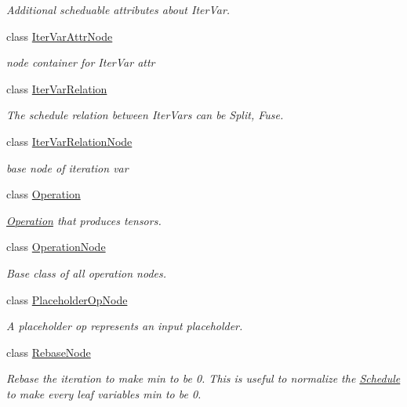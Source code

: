 \begin{DoxyCompactItemize}
\begin{DoxyCompactList}\small\item\em Additional scheduable attributes about Iter\+Var. \end{DoxyCompactList}\item 
class \hyperlink{classtvm_1_1te_1_1IterVarAttrNode}{Iter\+Var\+Attr\+Node}
\begin{DoxyCompactList}\small\item\em node container for Iter\+Var attr \end{DoxyCompactList}\item 
class \hyperlink{classtvm_1_1te_1_1IterVarRelation}{Iter\+Var\+Relation}
\begin{DoxyCompactList}\small\item\em The schedule relation between Iter\+Vars can be Split, Fuse. \end{DoxyCompactList}\item 
class \hyperlink{classtvm_1_1te_1_1IterVarRelationNode}{Iter\+Var\+Relation\+Node}
\begin{DoxyCompactList}\small\item\em base node of iteration var \end{DoxyCompactList}\item 
class \hyperlink{classtvm_1_1te_1_1Operation}{Operation}
\begin{DoxyCompactList}\small\item\em \hyperlink{classtvm_1_1te_1_1Operation}{Operation} that produces tensors. \end{DoxyCompactList}\item 
class \hyperlink{classtvm_1_1te_1_1OperationNode}{Operation\+Node}
\begin{DoxyCompactList}\small\item\em Base class of all operation nodes. \end{DoxyCompactList}\item 
class \hyperlink{classtvm_1_1te_1_1PlaceholderOpNode}{Placeholder\+Op\+Node}
\begin{DoxyCompactList}\small\item\em A placeholder op represents an input placeholder. \end{DoxyCompactList}\item 
class \hyperlink{classtvm_1_1te_1_1RebaseNode}{Rebase\+Node}
\begin{DoxyCompactList}\small\item\em Rebase the iteration to make min to be 0. This is useful to normalize the \hyperlink{classtvm_1_1te_1_1Schedule}{Schedule} to make every leaf variable\textquotesingle{}s min to be 0. \end{DoxyCompactList}\item 

\end{DoxyCompactItemize}

